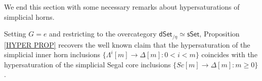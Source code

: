 \documentclass[a4paper,10pt
,draft
]{article}%
\begin{document}
%

We end this section with some necessary remarks about hypersaturations of simplicial horns.


\begin{remark}\label{SLICE REM}
	Setting $G=e$ and restricting to the overcategory
	$\mathsf{dSet}_{/\eta} \simeq \mathsf{sSet}$,
	Proposition \ref{HYPER PROP}
	recovers the well known claim that 
	the hypersaturation of the simplicial inner horn inclusions
	$\{\Lambda^i[m] \to \Delta[m] \colon 0< i < m\}$
	coincides with the hypersaturation of the simplicial Segal core inclusions
	$\{Sc[m] \to \Delta[m]\colon m \geq 0\}$.
\end{remark}
\end{document}
